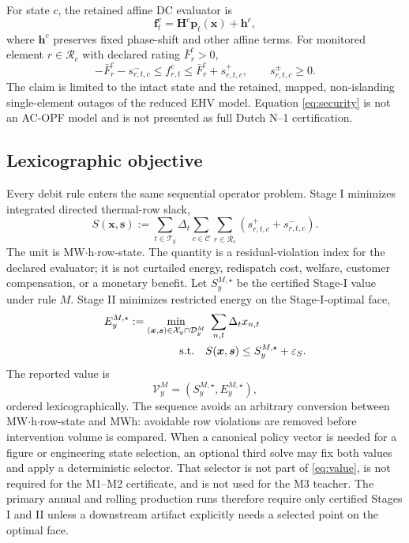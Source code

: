 \documentclass[10pt,journal]{IEEEtran}
\begin{document}
For state $c$, the retained affine DC evaluator is
\begin{equation}
\bm f_t^c=\bm H^c\bm p_t(\bm x)+\bm h^c,
\label{eq:affine_dc}
\end{equation}
where $\bm h^c$ preserves fixed phase-shift and other affine terms. For monitored element $r\in\mathcal R_c$ with declared rating $\bar F_r^c>0$,
\begin{equation}
-\bar F_r^c-s^-_{r,t,c}
\leq f^c_{r,t}\leq
\bar F_r^c+s^+_{r,t,c},
\qquad s^\pm_{r,t,c}\geq0.
\label{eq:security}
\end{equation}
The claim is limited to the intact state and the retained, mapped, non-islanding single-element outages of the reduced EHV model. Equation \eqref{eq:security} is not an AC-OPF model and is not presented as full Dutch N--1 certification.

\subsection{Lexicographic objective}

Every debit rule enters the same sequential operator problem. Stage I minimizes integrated directed thermal-row slack,
\begin{equation}
S(\bm x,\bm s)
:=\sum_{t\in\mathcal T_y}\Delta_t
\sum_{c\in\mathcal C}\sum_{r\in\mathcal R_c}
\left(s^+_{r,t,c}+s^-_{r,t,c}\right).
\label{eq:stage1}
\end{equation}
The unit is MW$\cdot$h$\cdot$row-state. The quantity is a residual-violation index for the declared evaluator; it is not curtailed energy, redispatch cost, welfare, customer compensation, or a monetary benefit. Let $S_y^{M,\star}$ be the certified Stage-I value under rule $M$. Stage II minimizes restricted energy on the Stage-I-optimal face,
\begin{align}
E_y^{M,\star}:=
\min_{(\bm x,\bm s)\in\mathcal X_y\cap\mathcal D_y^M}
&\ \sum_{n,t}\Delta_t x_{n,t}
\notag\\
\mathrm{s.t.}\quad
&S(\bm x,\bm s)
\leq S_y^{M,\star}+\varepsilon_S.
\label{eq:stage2}
\end{align}
The reported value is
\begin{equation}
\mathcal V_y^M=(S_y^{M,\star},E_y^{M,\star}),
\label{eq:value}
\end{equation}
ordered lexicographically. The sequence avoids an arbitrary conversion between MW$\cdot$h$\cdot$row-state and MWh: avoidable row violations are removed before intervention volume is compared. When a canonical policy vector is needed for a figure or engineering state selection, an optional third solve may fix both values and apply a deterministic selector. That selector is not part of \eqref{eq:value}, is not required for the M1--M2 certificate, and is not used for the M3 teacher. The primary annual and rolling production runs therefore require only certified Stages I and II unless a downstream artifact explicitly needs a selected point on the optimal face.
\end{document}

